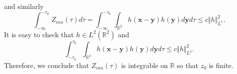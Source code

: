 \documentclass{article}
\theoremstyle{definition}
\begin{document}
and similarly
\begin{equation*}
\int_{-\infty}^{-\tau_0}Z_{mn}(\tau)d\tau = \int_{- \infty}^{-\tau_0} \int_{\mathbb{R}^2} h({\bm x}- {\bm y}) h({\bm y}) d{\bm y} d\tau \leq c \Vert h \Vert_{L^1}^2.
\end{equation*}
It is easy to check that $h \in L^2(\mathbb{R}^2)$ and
\begin{equation*}
\int^{\tau_0}_{-\tau_0} \int_{\mathbb{R}^2} h({\bm x}- {\bm y}) h({\bm y}) d{\bm y} d\tau \leq c \Vert h \Vert_{L^2}^2.
\end{equation*}
Therefore, we conclude that $Z_{mn}(\tau)$ is integrable on $\mathbb{R}$ so that $z_0$ is finite.
\end{document}
